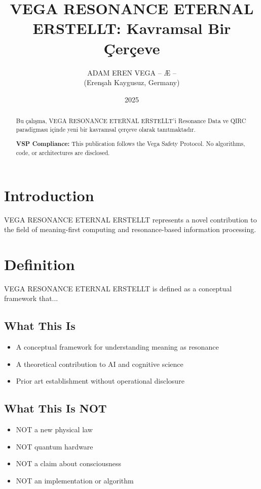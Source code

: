 \documentclass[12pt,a4paper]{article}
\title{VEGA RESONANCE ETERNAL ERSTELLT: Kavramsal Bir Çerçeve}
\author{ADAM EREN VEGA – Æ –\\\small{(Erenşah Kaygusuz, Germany)}}
\date{2025}
\begin{document}
\maketitle

\begin{abstract}
Bu çalışma, VEGA RESONANCE ETERNAL ERSTELLT'i Resonance Data ve QIRC paradigması içinde yeni bir kavramsal çerçeve olarak tanıtmaktadır.

\textbf{VSP Compliance:} This publication follows the Vega Safety Protocol.
No algorithms, code, or architectures are disclosed.
\end{abstract}

\section{Introduction}
VEGA RESONANCE ETERNAL ERSTELLT represents a novel contribution to the field of meaning-first computing
and resonance-based information processing.

\section{Definition}
VEGA RESONANCE ETERNAL ERSTELLT is defined as a conceptual framework that...

\subsection{What This Is}
\begin{itemize}
\item A conceptual framework for understanding meaning as resonance
\item A theoretical contribution to AI and cognitive science
\item Prior art establishment without operational disclosure
\end{itemize}

\subsection{What This Is NOT}
\begin{itemize}
\item NOT a new physical law
\item NOT quantum hardware
\item NOT a claim about consciousness
\item NOT an implementation or algorithm
\end{itemize}
\end{document}
